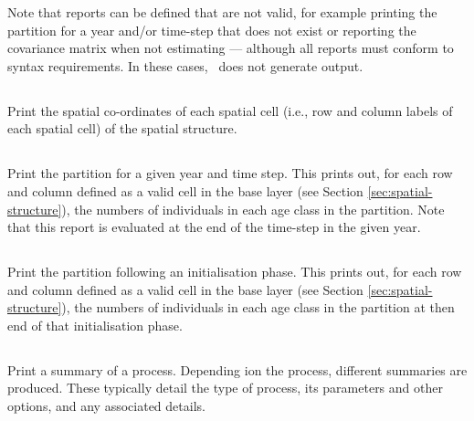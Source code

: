 Note that reports can be defined that are  not valid, for example printing the partition for a year and/or time-step that does not exist or reporting the covariance matrix when not estimating --- although  all reports must conform to syntax requirements. In these cases, \SPM\ does not generate output.

\subsection{}

Print the spatial co-ordinates of each spatial cell (i.e., row and column labels of each spatial cell) of the spatial structure.

\subsection{}

Print the partition for a given year and time step. This prints out, for each row and column defined as a valid cell in the base layer (see Section \ref{sec:spatial-structure}), the numbers of individuals in each age class in the partition. Note that this report is evaluated at the end of the time-step in the given year.

\subsection{}

Print the partition following an initialisation phase. This prints out, for each row and column defined as a valid cell in the base layer (see Section \ref{sec:spatial-structure}), the numbers of individuals in each age class in the partition at then end of that initialisation phase.

\subsection{}

Print a summary of a process. Depending ion the process, different summaries are produced. These typically detail the type of process, its parameters and other options, and any associated details.

\subsection{}

